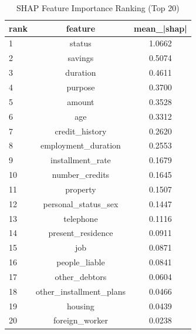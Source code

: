 \begin{table}
\centering
\caption{SHAP Feature Importance Ranking (Top 20)}
\label{tab:shap_ranking}
\begin{tabular}{lcc}
\toprule
rank & feature & mean_|shap| \\
\midrule
1 & status & 1.0662 \\
2 & savings & 0.5074 \\
3 & duration & 0.4611 \\
4 & purpose & 0.3700 \\
5 & amount & 0.3528 \\
6 & age & 0.3312 \\
7 & credit_history & 0.2620 \\
8 & employment_duration & 0.2553 \\
9 & installment_rate & 0.1679 \\
10 & number_credits & 0.1645 \\
11 & property & 0.1507 \\
12 & personal_status_sex & 0.1447 \\
13 & telephone & 0.1116 \\
14 & present_residence & 0.0911 \\
15 & job & 0.0871 \\
16 & people_liable & 0.0841 \\
17 & other_debtors & 0.0604 \\
18 & other_installment_plans & 0.0466 \\
19 & housing & 0.0439 \\
20 & foreign_worker & 0.0238 \\
\bottomrule
\end{tabular}
\end{table}
